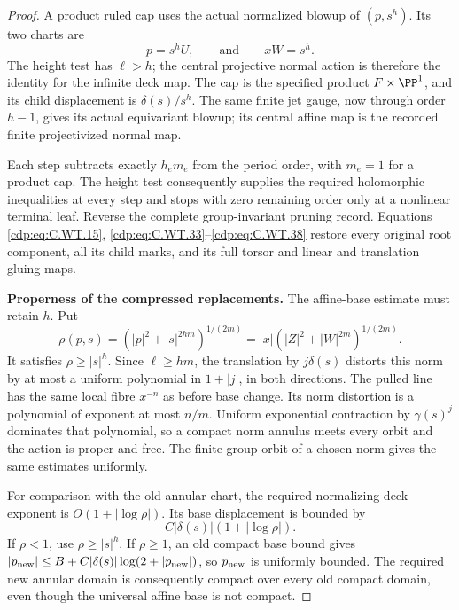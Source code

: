\begin{proof}
A product ruled cap uses the
actual normalized blowup of
\((p,s^h)\). Its two charts are
\[
                  p=s^hU,\qquad\text{and}\qquad xW=s^h .
 \tag{C.WT.38}\label{cdp:eq:C.WT.38}
\]
The height test has \(\ell>h\);
the central projective normal
action is therefore the identity
for the infinite deck map.
The cap is the specified
product \(F\times\PP^1\), and
its child displacement is
\(\delta(s)/s^h\).
The same finite jet gauge,
now through order \(h-1\),
gives its actual equivariant
blowup; its central affine
map is the recorded finite
projectivized normal map.

Each step subtracts exactly
\(h_em_e\) from the period
order, with \(m_e=1\) for
a product cap. The height
test consequently supplies
the required holomorphic
inequalities at every step
and stops with zero remaining
order only at a nonlinear
terminal leaf. Reverse the
complete group-invariant
pruning record. Equations
\eqref{cdp:eq:C.WT.15}, \eqref{cdp:eq:C.WT.33}--\eqref{cdp:eq:C.WT.38}
restore every original root
component, all its child marks,
and its full torsor and
linear and translation
gluing maps.

\par\medskip\noindent\textbf{Properness of the compressed replacements.}
The affine-base estimate must
retain \(h\). Put
\[
 \rho(p,s)=
       (|p|^2+|s|^{2hm})^{1/(2m)}
       =|x|(|Z|^2+|W|^{2m})^{1/(2m)} .
 \tag{C.WT.39}\label{cdp:eq:C.WT.39}
\]
It satisfies \(\rho\ge|s|^h\).
Since \(\ell\ge hm\), the
translation by \(j\delta(s)\)
distorts this norm by at most
a uniform polynomial in
\(1+|j|\), in both directions.
The pulled line has the same
local fibre \(x^{-n}\) as
before base change. Its norm
distortion is a polynomial
of exponent at most \(n/m\).
Uniform exponential contraction
by \(\gamma(s)^j\) dominates
that polynomial, so a compact
norm annulus meets every orbit
and the action is proper
and free. The finite-group
orbit of a chosen norm gives
the same estimates uniformly.

For comparison with the old
annular chart, the required
normalizing deck exponent is
\(O(1+|\log\rho|)\). Its base
displacement is bounded by
\[
              C|\delta(s)|(1+|\log\rho|).
 \tag{C.WT.40}\label{cdp:eq:C.WT.40}
\]
If \(\rho<1\), use
\(\rho\ge|s|^h\). If \(\rho\ge1\),
an old compact base bound
gives
\(|p_{\rm new}|\le B+
C|\delta(s)|\log(2+|p_{\rm new}|)\),
so \(p_{\rm new}\) is uniformly
bounded. The required new
annular domain is consequently
compact over every old compact
domain, even though the
universal affine base is
not compact.


\end{proof}
